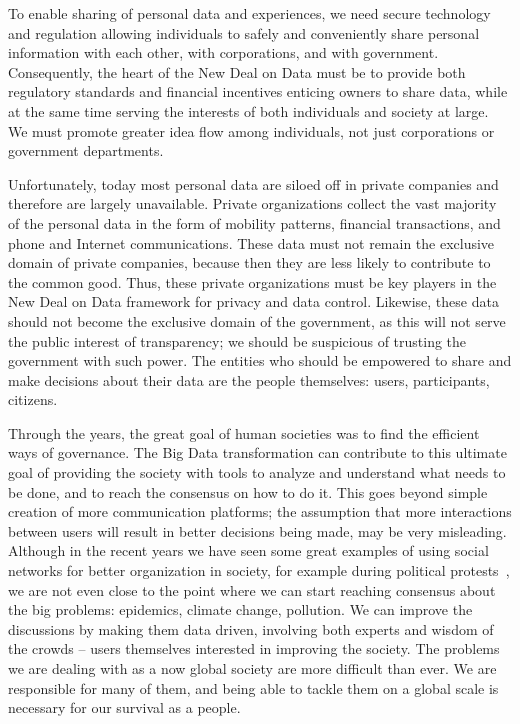 To enable sharing of personal data and experiences, we need secure technology and regulation allowing individuals to safely and conveniently share personal information with each other, with corporations, and with government.
Consequently, the heart of the New Deal on Data must be to provide both regulatory standards and financial incentives enticing owners to share data, while at the same time serving the interests of both individuals and society at large.
We must promote greater idea flow among individuals, not just corporations or government departments.

Unfortunately, today most personal data are siloed off in private companies and therefore are largely unavailable.
Private organizations collect the vast majority of the personal data in the form of mobility patterns, financial transactions, and phone and Internet communications.
These data must not remain the exclusive domain of private companies, because then they are less likely to contribute to the common good.
Thus, these private organizations must be key players in the New Deal on Data framework for privacy and data control.
Likewise, these data should not become the exclusive domain of the government, as this will not serve the public interest of transparency; we should be suspicious of trusting the government with such power.
The entities who should be empowered to share and make decisions about their data are the people themselves: users, participants, citizens.

Through the years, the great goal of human societies was to find the efficient ways of governance.
The Big Data transformation can contribute to this ultimate goal of providing the society with tools to analyze and understand what needs to be done, and to reach the consensus on how to do it.
This goes beyond simple creation of more communication platforms; the assumption that more interactions between users will result in better decisions being made, may be very misleading. 
Although in the recent years we have seen some great examples of using social networks for better organization in society, for example during political protests~\cite{grossman2009iran, barry2009protests}, we are not even close to the point where we can start reaching consensus about the big problems: epidemics, climate change, pollution.
We can improve the discussions by making them data driven, involving both experts and wisdom of the crowds -- users themselves interested in improving the society.
The problems we are dealing with as a now global society are more difficult than ever. 
We are responsible for many of them, and being able to tackle them on a global scale is necessary for our survival as a people.

